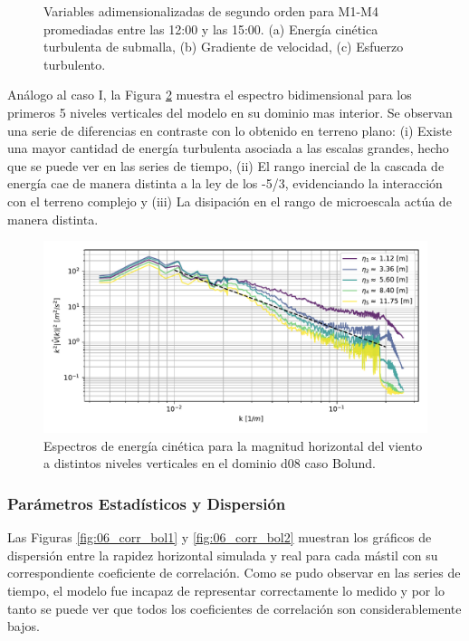 \begin{figure}[H]
\begin{center}
	\end{center}
	\vspace{-5mm}
	\caption{Variables adimensionalizadas de segundo orden para M1-M4 promediadas entre las 12:00 y las 15:00. (a) Energía cinética turbulenta de submalla, (b) Gradiente de velocidad, (c) Esfuerzo turbulento. }
	\label{fig:06_bol_mean_secondorder}
\end{figure}
\vspace*{\fill}
\newpage
Análogo al caso I, la Figura \ref{fig:06_bol_spectrum} muestra el espectro bidimensional para los primeros 5 niveles verticales del modelo en su dominio mas interior. Se observan una serie de diferencias en contraste con lo obtenido en terreno plano: (i) Existe una mayor cantidad de energía turbulenta asociada a las escalas grandes, hecho que se puede ver en las series de tiempo, (ii) El rango inercial de la cascada de energía cae de manera distinta a la ley de los -5/3, evidenciando la interacción con el terreno complejo y (iii) La disipación en el rango de microescala actúa de manera distinta.

\begin{figure}[H]
	\centering
	\includegraphics[width=1.0\linewidth,page=1,trim={3mm 5mm 3mm 3mm},clip]{Imagenes/06/bol/spectra}%
	\caption{Espectros de energía cinética para la magnitud horizontal del viento a distintos niveles verticales en el dominio d08 caso Bolund.}
	\label{fig:06_bol_spectrum}
\end{figure}
\subsubsection{Parámetros Estadísticos y Dispersión}
Las Figuras \ref{fig:06_corr_bol1} y \ref{fig:06_corr_bol2} muestran los gráficos de dispersión entre la rapidez horizontal simulada y real para cada mástil con su correspondiente coeficiente de correlación. Como se pudo observar en las series de tiempo, el modelo fue incapaz de representar correctamente lo medido y por lo tanto se puede ver que todos los coeficientes de correlación son considerablemente bajos.

